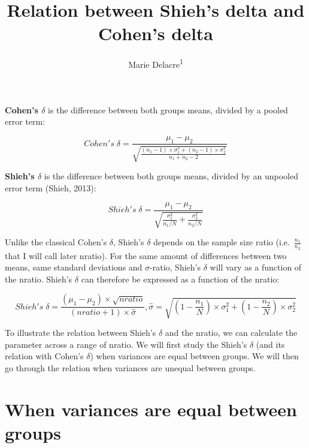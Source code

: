 \documentclass[
  man]{apa6}
\affiliation{
\vspace{0.5cm}
\textsuperscript{1} Université Libre de Bruxelles, Service of Analysis of the Data (SAD), Bruxelles, Belgium}
\title{Relation between Shieh's delta and Cohen's delta}
\author{Marie Delacre\textsuperscript{1}}
\date{}
\begin{document}
\maketitle

\textbf{Cohen's \(\delta\)} is the difference between both groups means, divided by a pooled error term:

\begin{equation} 
Cohen's \; \delta= \frac{\mu_{1}-\mu_{2}}{\sqrt{\frac{(n_{1}-1) \times \sigma^2_{1} + (n_{2}-1) \times \sigma^2_{2}}{n_{1}+n_{2}-2}}}
\label{eq:cohend}
\end{equation}

\textbf{Shieh's \(\delta\)} is the difference between both groups means, divided by an unpooled error term (Shieh, 2013):

\begin{equation} 
Shieh's \; \delta= \frac{\mu_{1}-\mu_{2}} {\sqrt{\frac{\sigma_1^2}{n_1/N}+\frac{\sigma_2^2}{n_2/N}}}
\label{eq:shiehs}
\end{equation}

Unlike the classical Cohen's \(\delta\), Shieh's \(\delta\) depends on the sample size ratio (i.e.~\(\frac{n_1}{n_2}\) that I will call later nratio). For the same amount of differences between two means, same standard deviations and \(\sigma\)-ratio, Shieh's \(\delta\) will vary as a function of the nratio. Shieh's \(\delta\) can therefore be expressed as a function of the nratio:

\begin{equation} 
Shieh's \; \delta= \frac{(\mu_1-\mu_2) \times \sqrt{nratio}}{(nratio+1) \times \hat{\sigma}},\hat{\sigma} = \sqrt{(1-\frac{n_1}{N}) \times \sigma_1^2+(1-\frac{n_2}{N}) \times \sigma_2^2}
\label{eq:shieh}
\end{equation}

To illustrate the relation between Shieh's \(\delta\) and the nratio, we can calculate the parameter across a range of nratio. We will first study the Shieh's \(\delta\) (and its relation with Cohen's \(\delta\)) when variances are equal between groups. We will then go through the relation when variances are unequal between groups.

\hypertarget{when-variances-are-equal-between-groups}{%
\section{When variances are equal between groups}\label{when-variances-are-equal-between-groups}}
\end{document}
